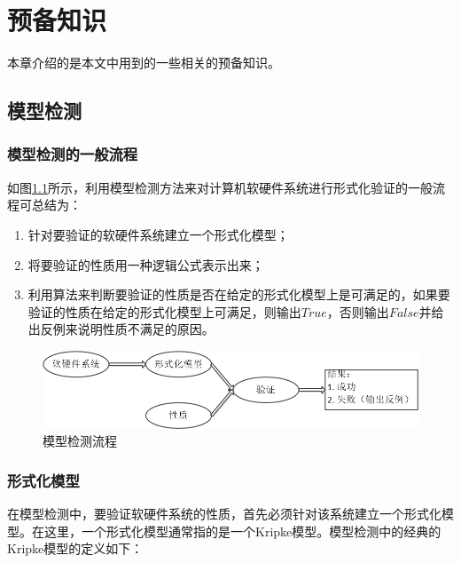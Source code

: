 \chapter{预备知识}\label{chapt:preliminary}
本章介绍的是本文中用到的一些相关的预备知识。
\section{模型检测}
\subsection{模型检测的一般流程}
如图\ref{modelchecking:overview}所示，利用模型检测方法来对计算机软硬件系统进行形式化验证的一般流程可总结为：
\begin{enumerate}
	\item 针对要验证的软硬件系统建立一个形式化模型；
	\item 将要验证的性质用一种逻辑公式表示出来；
	\item 利用算法来判断要验证的性质是否在给定的形式化模型上是可满足的，如果要验证的性质在给定的形式化模型上可满足，则输出$True$，否则输出$False$并给出反例来说明性质不满足的原因。
\end{enumerate}
\begin{figure}[h!]
	\centering
	\caption{模型检测流程}
	\label{modelchecking:overview}
	\includegraphics[width=12cm]{Img/model_checking_overview.png}
	
\end{figure}
\subsection{形式化模型}
在模型检测中，要验证软硬件系统的性质，首先必须针对该系统建立一个形式化模型。在这里，一个形式化模型通常指的是一个Kripke模型。模型检测中的经典的Kripke模型的定义如下：



